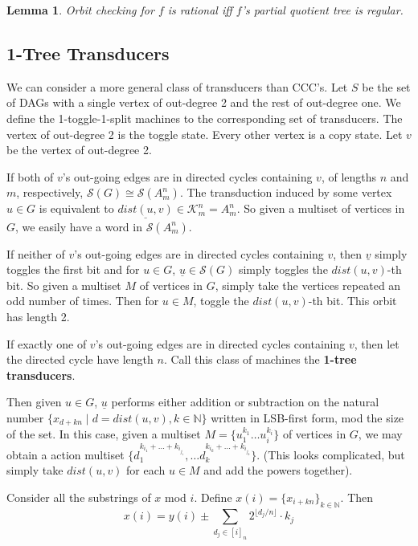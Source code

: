 \documentclass[11pt]{article}
\theoremstyle{pleasant}
\newtheorem{lemma}{Lemma}
\newcommand{\0}{\underline{0}}
\newcommand{\1}{\underline{1}}
\newcommand{\2}{\underline{2}}
\newcommand{\N}{\mathbb{N}}
\renewcommand{\S}{\mathcal{S}}
\begin{document}
\begin{lemma}
Orbit checking for $f$ is rational iff $f$'s partial quotient tree is regular.
\end{lemma}

\subsection*{1-Tree Transducers}

We can consider a more general class of transducers than CCC's. Let $S$ be the set of DAGs with a single vertex of out-degree 2 and the rest of out-degree one. We define the 1-toggle-1-split machines to the corresponding set of transducers. The vertex of out-degree 2 is the toggle state. Every other vertex is a copy state. Let $v$ be the vertex of out-degree 2.

If both of $v$'s out-going edges are in directed cycles containing $v$, of lengths $n$ and $m$, respectively, $\S(G) \cong \S(A^n_m)$. The transduction induced by some vertex $u \in G$ is equivalent to $\underline{dist(u, v)} \in \mathcal{K}^n_m = A^n_m$. So given a multiset of vertices in $G$, we easily have a word in $\S(A^n_m)$.

If neither of $v$'s out-going edges are in directed cycles containing $v$, then $\underline{v}$ simply toggles the first bit and for $u \in G$, $\underline{u} \in \S(G)$ simply toggles the $dist(u, v)$-th bit. So given a multiset $M$ of vertices in $G$, simply take the vertices repeated an odd number of times. Then for $u \in M$, toggle the $dist(u, v)$-th bit. This orbit has length 2.

If exactly one of $v$'s out-going edges are in directed cycles containing $v$, then let the directed cycle have length $n$. Call this class of machines the \textbf{1-tree transducers}.

Then given $u \in G$, $\underline{u}$ performs either addition or subtraction on the natural number $\{x_{d+kn} \mid d = dist(u, v), k \in \N \}$ written in LSB-first form, mod the size of the set. In this case, given a multiset $M = \{ u_1^{k_1}\ldots u_i^{k_i} \}$ of vertices in $G$, we may obtain a action multiset $\{ d_1^{k_{i_1} + \ldots + k_{i_{j_1}}}, \ldots d_k^{k_{i_k} + \ldots + k_{i_{j_k}}} \}$. (This looks complicated, but simply take $dist(u, v)$ for each $u \in M$ and add the powers together).

Consider all the substrings of $x$ mod $i$. Define $x(i) = \{x_{i+kn}\}_{k\in\N}$. Then
$$x(i) = y(i) \pm \sum_{d_j \in [i]_n} 2^{\lfloor d_j / n\rfloor} \cdot k_j$$
\end{document}

